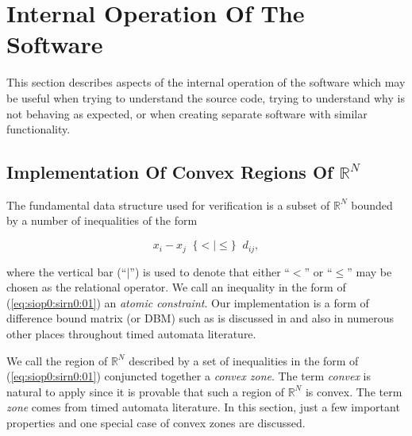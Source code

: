 %
\section{Internal Operation Of The Software}
\label{siop0}

This section describes aspects of the internal operation of the software
which may be useful when trying to understand the source code, trying to
understand why \swname{} is not behaving as expected, or when creating
separate software with similar functionality.


\subsection[Implementation Of Convex Regions Of $\mathbb{R}^N$]
           {Implementation Of Convex Regions Of \mbox{\boldmath $\mathbb{R}^N$}}
\label{siop0:sirn0}

The fundamental data structure used for verification is a subset of
$\mathbb{R}^N$ bounded by a number of inequalities of the form

\begin{equation}
\label{eq:siop0:sirn0:01}
x_i - x_j \;\; \{<|\leq\} \;\; d_{ij},
\end{equation}

\noindent{}where the vertical bar (``$|$'') is used to denote that either
``$<$'' or ``$\leq$'' may be chosen as the relational operator.
We call an inequality in the form of (\ref{eq:siop0:sirn0:01})
an \emph{atomic constraint}.
Our implementation is a form of difference bound matrix (or DBM)
such as is discussed in 
\cite[Section 17.6, p. 287]{bib:b:modelchecking:clark1999} and also
in numerous other places throughout timed automata literature.

We call the region of $\mathbb{R}^N$ described by a set of
inequalities in the form of (\ref{eq:siop0:sirn0:01}) conjuncted
together
a \emph{convex zone}.  The term
\emph{convex} is natural to apply since it is provable that
such a region of $\mathbb{R}^N$ is convex.  The term
\emph{zone} comes from timed automata literature.
In this section, just a few important properties 
and one special case of convex zones
are discussed.

